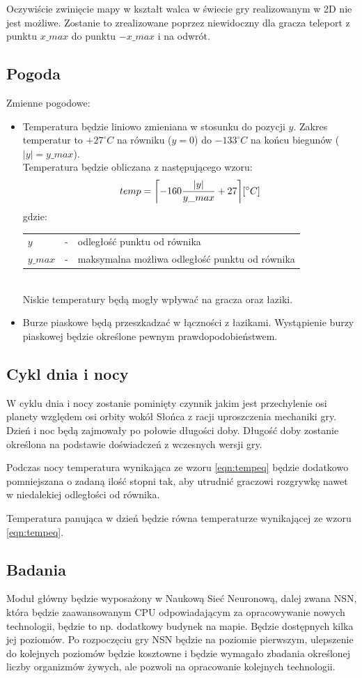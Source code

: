 \documentclass[a4paper,12pt]{article}
\DeclarePairedDelimiter{\ceil}{\lceil}{\rceil}
\begin{document}
Oczywiście zwinięcie mapy w kształt walca w świecie gry realizowanym w 2D nie jest możliwe. Zostanie to zrealizowane poprzez niewidoczny dla gracza teleport z punktu $x\_max$ do punktu $-x\_max$ i na odwrót.
\subsection{Pogoda}
Zmienne pogodowe:
\begin{itemize}
	\item Temperatura będzie liniowo zmieniana w stosunku do pozycji $y$. Zakres temperatur to $+27^{\circ}C$ na równiku ($y = 0$) do $-133^{\circ}C$ na końcu biegunów ($|y| = y\_max$).\\
	Temperatura będzie obliczana z następującego wzoru:
	\begin{equation}
	\label{eqn:tempeq}
	temp = \ceil[\bigg]{-160\frac{|y|}{y\_max} + 27} [^{\circ}C]
	\end{equation}
	gdzie:\\
	\begin{tabular}{l l l}
	$y$ & - & odległość punktu od równika\\
	$y\_max$ & - & maksymalna możliwa odległość punktu od równika
	\end{tabular}
	\vspace{1em} \\ Niskie temperatury będą mogły wpływać na gracza oraz łaziki.
	\item Burze piaskowe będą przeszkadzać w łączności z łazikami. Wystąpienie burzy piaskowej będzie określone pewnym prawdopodobieństwem.
\end{itemize}
\subsection{Cykl dnia i nocy}
W cyklu dnia i nocy zostanie pominięty czynnik jakim jest przechylenie osi planety względem osi orbity wokół Słońca z racji uproszczenia mechaniki gry. Dzień i noc będą zajmowały po połowie długości doby. Długość doby zostanie określona na podstawie doświadczeń z wczesnych wersji gry.

Podczas nocy temperatura wynikająca ze wzoru \ref{eqn:tempeq} będzie dodatkowo pomniejszana o zadaną ilość stopni tak, aby utrudnić graczowi rozgrywkę nawet w niedalekiej odległości od równika.

Temperatura panująca w dzień będzie równa temperaturze wynikającej ze wzoru \ref{eqn:tempeq}.
\subsection{Badania}
Moduł główny będzie wyposażony w Naukową Sieć Neuronową, dalej zwana NSN, która będzie zaawansowanym CPU odpowiadającym za opracowywanie nowych technologii, będzie to np. dodatkowy budynek na mapie. Będzie dostępnych kilka jej poziomów. Po rozpoczęciu gry NSN będzie na poziomie pierwszym, ulepszenie do kolejnych poziomów będzie kosztowne i będzie wymagało zbadania określonej liczby organizmów żywych, ale pozwoli na opracowanie kolejnych technologii.
\end{document}
